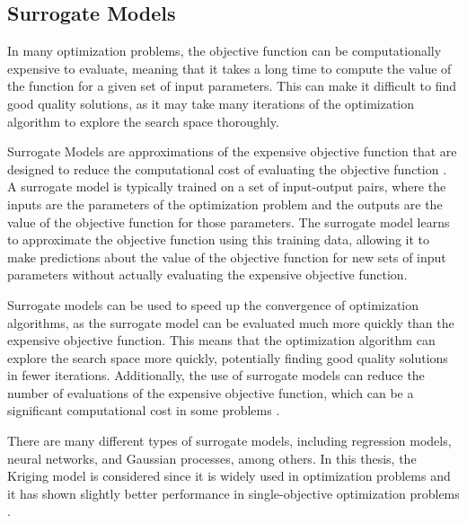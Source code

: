 		\subsection{Surrogate Models}\label{chap:proposed-methodology:surrogate:explanation}
			
			In many optimization problems, the objective function can be computationally expensive to evaluate, meaning that it takes a long time to compute the value of the function for a given set of input parameters. This can make it difficult to find good quality solutions, as it may take many iterations of the optimization algorithm to explore the search space thoroughly.
			
			Surrogate Models are approximations of the expensive objective function that are designed to reduce the computational cost of evaluating the objective function \citep{schonlau1997computer,mendes2013surrogate,sacks1989design}. A surrogate model is typically trained on a set of input-output pairs, where the inputs are the parameters of the optimization problem and the outputs are the value of the objective function for those parameters. The surrogate model learns to approximate the objective function using this training data, allowing it to make predictions about the value of the objective function for new sets of input parameters without actually evaluating the expensive objective function.
			
			Surrogate models can be used to speed up the convergence of optimization algorithms, as the surrogate model can be evaluated much more quickly than the expensive objective function. This means that the optimization algorithm can explore the search space more quickly, potentially finding good quality solutions in fewer iterations. Additionally, the use of surrogate models can reduce the number of evaluations of the expensive objective function, which can be a significant computational cost in some problems \citep{sobester2008engineering}.
			
			There are many different types of surrogate models, including regression models, neural networks, and Gaussian processes, among others. In this thesis, the Kriging model is considered since it is widely used in optimization problems \citep{emmerich2006single,zhao2011metamodeling,yang2019two} and it has shown slightly better performance in single-objective optimization problems \citep{valadao2020comparative}. 
			
		
